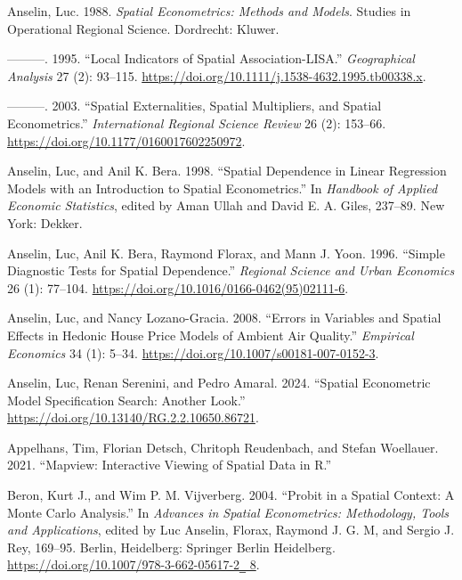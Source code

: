 \documentclass[
  letterpaper,
]{scrbook}
\newlength{\cslhangindent}
\newlength{\cslentryspacingunit} %
\newenvironment{CSLReferences}[2] %
 {%
  \setlength{\parindent}{0pt}
  \ifodd #1
  \let\oldpar\par
  \def\par{\hangindent=\cslhangindent\oldpar}
  \fi
  \setlength{\parskip}{#2\cslentryspacingunit}
 }%
 {}
\begin{document}
\hypertarget{refs}{}
\begin{CSLReferences}{1}{0}
\leavevmode{}%
Anselin, Luc. 1988. \emph{Spatial {Econometrics}: {Methods} and
{Models}}. Studies in {Operational Regional Science}. {Dordrecht}:
{Kluwer}.

\leavevmode{}%
---------. 1995. {``Local {Indicators} of {Spatial Association-LISA}.''}
\emph{Geographical Analysis} 27 (2): 93--115.
\url{https://doi.org/10.1111/j.1538-4632.1995.tb00338.x}.

\leavevmode{}%
---------. 2003. {``Spatial {Externalities}, {Spatial Multipliers}, and
{Spatial Econometrics}.''} \emph{International Regional Science Review}
26 (2): 153--66. \url{https://doi.org/10.1177/0160017602250972}.

\leavevmode{}%
Anselin, Luc, and Anil K. Bera. 1998. {``Spatial {Dependence} in {Linear
Regression Models} with an {Introduction} to {Spatial Econometrics}.''}
In \emph{Handbook of {Applied Economic Statistics}}, edited by Aman
Ullah and David E. A. Giles, 237--89. {New York}: {Dekker}.

\leavevmode{}%
Anselin, Luc, Anil K. Bera, Raymond Florax, and Mann J. Yoon. 1996.
{``Simple {Diagnostic Tests} for {Spatial Dependence}.''} \emph{Regional
Science and Urban Economics} 26 (1): 77--104.
\url{https://doi.org/10.1016/0166-0462(95)02111-6}.

\leavevmode{}%
Anselin, Luc, and Nancy Lozano-Gracia. 2008. {``Errors in {Variables}
and {Spatial Effects} in {Hedonic House Price Models} of {Ambient Air
Quality}.''} \emph{Empirical Economics} 34 (1): 5--34.
\url{https://doi.org/10.1007/s00181-007-0152-3}.

\leavevmode{}%
Anselin, Luc, Renan Serenini, and Pedro Amaral. 2024. {``Spatial
{Econometric Model Specification Search}: {Another Look}.''}
\url{https://doi.org/10.13140/RG.2.2.10650.86721}.

\leavevmode{}%
Appelhans, Tim, Florian Detsch, Chritoph Reudenbach, and Stefan
Woellauer. 2021. {``Mapview: {Interactive Viewing} of {Spatial Data} in
{R}.''}

\leavevmode{}%
Beron, Kurt J., and Wim P. M. Vijverberg. 2004. {``Probit in a {Spatial
Context}: {A Monte Carlo Analysis}.''} In \emph{Advances in {Spatial
Econometrics}: {Methodology}, {Tools} and {Applications}}, edited by Luc
Anselin, Florax, Raymond J. G. M, and Sergio J. Rey, 169--95. {Berlin,
Heidelberg}: {Springer Berlin Heidelberg}.
\href{https://doi.org/10.1007/978-3-662-05617-2‗\%208}{https://doi.org/10.1007/978-3-662-05617-2‗
8}.


\end{CSLReferences}
\end{document}
